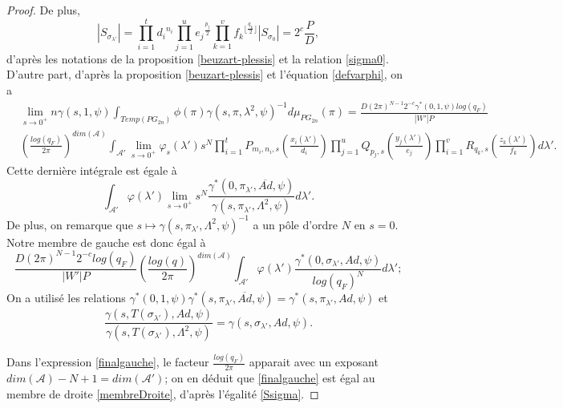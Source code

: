 \documentclass{amsart}
\begin{document}
\begin{proof}
De plus,
\begin{equation}
\label{Ssigma}
|S_{\sigma_{\lambda'}}| = \prod_{i=1}^t {d_i}^{n_i} \prod_{j=1}^u {e_j}^{\frac{p_j}{2}} \prod_{k=1}^v {f_k}^{\lfloor \frac{q_k}{2} \rfloor} |S_{\sigma_0}| = 2^c \frac{P}{D},
\end{equation}
d'après les notations de la proposition \ref{beuzart-plessis} et la relation \ref{sigma0}. D'autre part, d'après la proposition \ref{beuzart-plessis} et l'équation \ref{defvarphi}, on a
\begin{equation}
\begin{split}
& \lim_{s \rightarrow 0^+}  n \gamma(s, 1, \psi) \int_{Temp(PG_{2n})} \phi(\pi) \gamma(s, \pi, \lambda^2, \psi)^{-1} d\mu_{PG_{2n}}(\pi) = \frac{D(2\pi)^{N-1}2^{-c} \gamma^*(0, 1, \psi)log(q_F)}{|W'|P} \\
&\left(\frac{log(q_F)}{2\pi}\right)^{dim(\mathcal{A})}\int_{\mathcal{A}'} \lim_{s \rightarrow 0^+} \varphi_s(\lambda') s^N \prod_{i=1}^t P_{m_i,n_i,s}(\frac{x_i(\lambda')}{d_i}) \prod_{j=1}^u Q_{p_j,s}(\frac{y_j(\lambda')}{e_j}) \prod_{i=1}^v R_{q_k,s}(\frac{z_k(\lambda')}{f_k}) d\lambda'.
\end{split}
\end{equation}
Cette dernière intégrale est égale à
\begin{equation}
\int_{\mathcal{A}'} \varphi(\lambda') \lim_{s \rightarrow 0^+} s^N \frac{\gamma^*(0, \pi_{\lambda'}, \overline{Ad}, \psi)}{\gamma(s, \pi_{\lambda'}, \Lambda^2, \psi)} d\lambda'.
\end{equation}
De plus, on remarque que $s \mapsto \gamma(s, \pi_{\lambda'}, \Lambda^2, \psi)^{-1}$ a un pôle d'ordre $N$ en $s=0$. Notre membre de gauche est donc égal à
\begin{equation}
\label{finalgauche}
\frac{D\left(2\pi\right)^{N-1}2^{-c}log(q_F)}{|W'|P} \left(\frac{log(q)}{2\pi}\right)^{dim(\mathcal{A})} \int_{\mathcal{A}'} \varphi(\lambda') \frac{\gamma^*(0, \sigma_{\lambda'}, Ad, \psi)}{log(q_F)^N} d\lambda';
\end{equation}
On a utilisé les relations $\gamma^*(0, 1, \psi)\gamma^*(s, \pi_{\lambda'}, \overline{Ad}, \psi) = \gamma^*(s, \pi_{\lambda'}, Ad, \psi)$ et
\begin{equation}
\frac{\gamma(s, T(\sigma_{\lambda'}), Ad, \psi)}{\gamma(s, T(\sigma_{\lambda'}), \Lambda^2, \psi)} = \gamma(s, \sigma_{\lambda'}, Ad, \psi).
\end{equation}

Dans l'expression \ref{finalgauche}, le facteur $\frac{log(q_F)}{2\pi}$ apparait avec un exposant $dim(\mathcal{A})-N+1 = dim(\mathcal{A}')$; on en déduit que \ref{finalgauche} est égal au membre de droite \ref{membreDroite}, d'après l'égalité \ref{Ssigma}.
\end{proof}
\end{document}
